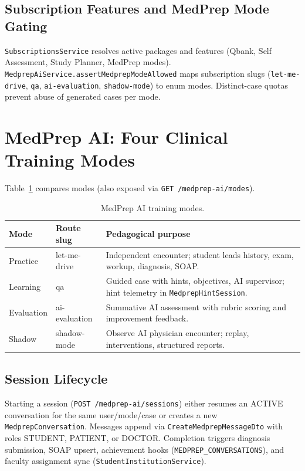 \subsection{Subscription Features and MedPrep Mode Gating}
\texttt{SubscriptionsService} resolves active packages and features (Qbank, Self Assessment, Study Planner, MedPrep modes). \texttt{MedprepAiService.assertMedprepModeAllowed} maps subscription slugs (\texttt{let-me-drive}, \texttt{qa}, \texttt{ai-evaluation}, \texttt{shadow-mode}) to enum modes. Distinct-case quotas prevent abuse of generated cases per mode.

\section{MedPrep AI: Four Clinical Training Modes}
Table~\ref{tab:modes} compares modes (also exposed via \texttt{GET /medprep-ai/modes}).

\begin{table}[htbp]
  \centering
  \caption{MedPrep AI training modes.}
  \label{tab:modes}
  \begin{tabular}{@{}p{2.2cm}p{3.2cm}p{7cm}@{}}
    \toprule
    \textbf{Mode} & \textbf{Route slug} & \textbf{Pedagogical purpose} \\
    \midrule
    Practice & let-me-drive & Independent encounter; student leads history, exam, workup, diagnosis, SOAP. \\
    Learning & qa & Guided case with hints, objectives, AI supervisor; hint telemetry in \texttt{MedprepHintSession}. \\
    Evaluation & ai-evaluation & Summative AI assessment with rubric scoring and improvement feedback. \\
    Shadow & shadow-mode & Observe AI physician encounter; replay, interventions, structured reports. \\
    \bottomrule
  \end{tabular}
\end{table}

\subsection{Session Lifecycle}
Starting a session (\texttt{POST /medprep-ai/sessions}) either resumes an ACTIVE conversation for the same user/mode/case or creates a new \texttt{MedprepConversation}. Messages append via \texttt{CreateMedprepMessageDto} with roles STUDENT, PATIENT, or DOCTOR. Completion triggers diagnosis submission, SOAP upsert, achievement hooks (\texttt{MEDPREP\_CONVERSATIONS}), and faculty assignment sync (\texttt{StudentInstitutionService}).

